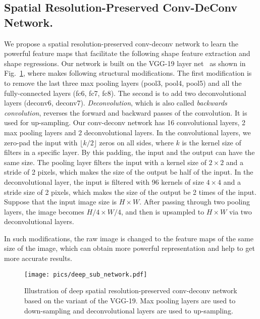 \documentclass[journal]{IEEEtran}
\begin{document}
\subsection{Spatial Resolution-Preserved Conv-DeConv Network.} We propose a spatial resolution-preserved conv-deconv network to learn the powerful feature maps that facilitate the following shape feature extraction and shape regressions. Our network is built on the VGG-19 layer net~\cite{vgg} as shown in Fig.~\ref{subnetwork}, where makes following structural modifications. The first modification is to remove the last three max pooling layers (pool3, pool4, pool5) and all the fully-connected layers (fc6, fc7, fc8). The second is to add two deconvolutional layers \cite{long2014fully,noh2015learning} (deconv6, deconv7).  \textit{Deconvolution}, which is also called \textit{backwards convolution}, reverses the forward and backward passes of the convolution. It is used for up-sampling. Our conv-deconv network has 16 convolutional layers, 2 max pooling layers and 2 deconvolutional layers. In the convolutional layers, we zero-pad the input with $\lfloor k/2  \rfloor$  zeros on all sides, where $k$ is the kernel size of filters in a specific layer. By this padding, the input and the output can have the same size. The pooling layer filters the input with a kernel size of $2 \times 2$ and a stride of 2 pixels, which makes the size of the output be half of the input. In the deconvolutional layer, the input is filtered with 96 kernels of size $4 \times 4$ and a stride size of 2 pixels, which makes the size of the output be 2 times of the input. Suppose that the input image size is $H \times W$. After passing through two pooling layers, the image becomes $H/4 \times W/4$, and then is upsampled to $H \times W$ via two deconvolutional layers.

In such modifications, the raw image is changed to the feature maps of the same size of the image, which can obtain more powerful representation and help to get more accurate results.

\begin{figure}
    \texttt{[image: pics/deep\_sub\_network.pdf]}
  \caption{Illustration of deep spatial resolution-preserved conv-deconv network based on the variant of the VGG-19. Max pooling layers are used to down-sampling and deconvolutional layers are used to up-sampling.}
  \label{subnetwork}  %
\end{figure}
\end{document}
